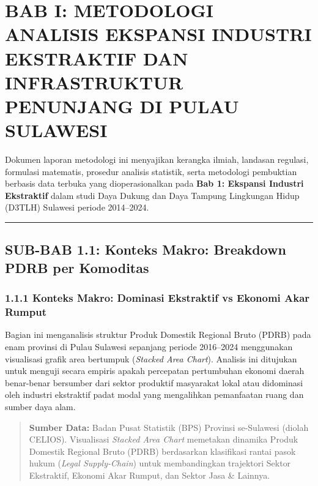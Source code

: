 \documentclass[
]{article}
\author{}
\date{}
\begin{document}
\section{BAB I: METODOLOGI ANALISIS EKSPANSI INDUSTRI EKSTRAKTIF DAN
INFRASTRUKTUR PENUNJANG DI PULAU
SULAWESI}\label{bab-i-metodologi-analisis-ekspansi-industri-ekstraktif-dan-infrastruktur-penunjang-di-pulau-sulawesi}

Dokumen laporan metodologi ini menyajikan kerangka ilmiah, landasan
regulasi, formulasi matematis, prosedur analisis statistik, serta
metodologi pembuktian berbasis data terbuka yang dioperasionalkan pada
\textbf{Bab 1: Ekspansi Industri Ekstraktif} dalam studi Daya Dukung dan
Daya Tampung Lingkungan Hidup (D3TLH) Sulawesi periode 2014--2024.

\begin{center}\rule{0.5\linewidth}{0.5pt}\end{center}

\subsection{SUB-BAB 1.1: Konteks Makro: Breakdown PDRB per
Komoditas}\label{sub-bab-1.1-konteks-makro-breakdown-pdrb-per-komoditas}

\subsubsection{1.1.1 Konteks Makro: Dominasi Ekstraktif vs Ekonomi Akar
Rumput}\label{konteks-makro-dominasi-ekstraktif-vs-ekonomi-akar-rumput}

Bagian ini menganalisis struktur Produk Domestik Regional Bruto (PDRB)
pada enam provinsi di Pulau Sulawesi sepanjang periode 2016--2024
menggunakan visualisasi grafik area bertumpuk (\emph{Stacked Area
Chart}). Analisis ini ditujukan untuk menguji secara empiris apakah
percepatan pertumbuhan ekonomi daerah benar-benar bersumber dari sektor
produktif masyarakat lokal atau didominasi oleh industri ekstraktif
padat modal yang mengalihkan pemanfaatan ruang dan sumber daya alam.

\begin{quote}
\textbf{Sumber Data:} Badan Pusat Statistik (BPS) Provinsi se-Sulawesi
(diolah CELIOS). Visualisasi \emph{Stacked Area Chart} memetakan
dinamika Produk Domestik Regional Bruto (PDRB) berdasarkan klasifikasi
rantai pasok hukum (\emph{Legal Supply-Chain}) untuk membandingkan
trajektori Sektor Ekstraktif, Ekonomi Akar Rumput, dan Sektor Jasa \&
Lainnya.
\end{quote}
\end{document}
